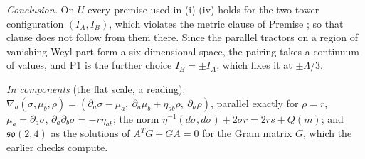 \emph{Conclusion.} On $U$ every premise used in (i)-(iv) holds for the two-tower configuration $(I_A, I_B)$, which violates the metric clause of Premise ; so that clause does not follow from them there. Since the parallel tractors on a region of vanishing Weyl part form a six-dimensional space, the pairing takes a continuum of values, and P1 is the further choice $I_B = \pm I_A$, which fixes it at $\pm\Lambda/3$.

\emph{In components} (the flat scale, a reading): $\nabla_a(\sigma, \mu_b, \rho) = (\partial_a\sigma - \mu_a,\ \partial_a\mu_b + \eta_{ab}\rho,\ \partial_a\rho)$, parallel exactly for $\rho = r$, $\mu_a = \partial_a\sigma$, $\partial_a\partial_b\sigma = -r\eta_{ab}$; the norm $\eta^{-1}(d\sigma, d\sigma) + 2\sigma r = 2rs + Q(m)$; and $\mathfrak{so}(2,4)$ as the solutions of $A^{T}G + GA = 0$ for the Gram matrix $G$, which the earlier checks compute.

